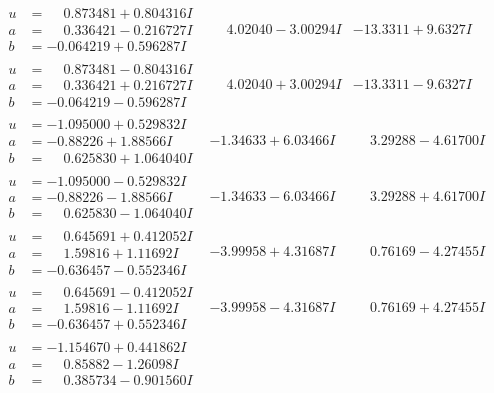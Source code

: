 \documentclass[1p]{elsarticle_modified}
\theoremstyle{definition}
\begin{document}
$$\begin{array}{c|c|c}
\begin{aligned}
u &= \phantom{-}0.873481 + 0.804316 I \\
a &= \phantom{-}0.336421 - 0.216727 I \\
b &= -0.064219 + 0.596287 I\end{aligned}
 & \phantom{-}4.02040 - 3.00294 I & -13.3311 + 9.6327 I \\ \hline\begin{aligned}
u &= \phantom{-}0.873481 - 0.804316 I \\
a &= \phantom{-}0.336421 + 0.216727 I \\
b &= -0.064219 - 0.596287 I\end{aligned}
 & \phantom{-}4.02040 + 3.00294 I & -13.3311 - 9.6327 I \\ \hline\begin{aligned}
u &= -1.095000 + 0.529832 I \\
a &= -0.88226 + 1.88566 I \\
b &= \phantom{-}0.625830 + 1.064040 I\end{aligned}
 & -1.34633 + 6.03466 I & \phantom{-}3.29288 - 4.61700 I \\ \hline\begin{aligned}
u &= -1.095000 - 0.529832 I \\
a &= -0.88226 - 1.88566 I \\
b &= \phantom{-}0.625830 - 1.064040 I\end{aligned}
 & -1.34633 - 6.03466 I & \phantom{-}3.29288 + 4.61700 I \\ \hline\begin{aligned}
u &= \phantom{-}0.645691 + 0.412052 I \\
a &= \phantom{-}1.59816 + 1.11692 I \\
b &= -0.636457 - 0.552346 I\end{aligned}
 & -3.99958 + 4.31687 I & \phantom{-}0.76169 - 4.27455 I \\ \hline\begin{aligned}
u &= \phantom{-}0.645691 - 0.412052 I \\
a &= \phantom{-}1.59816 - 1.11692 I \\
b &= -0.636457 + 0.552346 I\end{aligned}
 & -3.99958 - 4.31687 I & \phantom{-}0.76169 + 4.27455 I \\ \hline\begin{aligned}
u &= -1.154670 + 0.441862 I \\
a &= \phantom{-}0.85882 - 1.26098 I \\
b &= \phantom{-}0.385734 - 0.901560 I\end{aligned}

\end{array}$$
\end{document}
